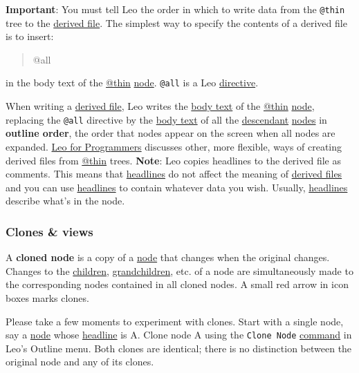 \documentclass[10pt,a4paper,english]{article}
\begin{document}
\textbf{Important}:
You must tell Leo the order in which to write data from the \texttt{@thin} tree to the \href{\#derived-files}{derived file}.
The simplest way to specify the contents of a derived file is to insert:
\begin{quote}{\ttfamily \raggedright \noindent
@all
}\end{quote}

in the body text of the \href{glossary.html\#thin}{@thin} \href{glossary.html\#node}{node}.
\texttt{@all} is a Leo \href{\#leo-directives}{directive}.

When writing a \href{\#derived-files}{derived file}, Leo writes the \href{glossary.html\#body-text}{body text} of the \href{glossary.html\#thin}{@thin} \href{glossary.html\#node}{node},
replacing the \texttt{@all} directive by the \href{glossary.html\#body-text}{body text} of all the \href{glossary.html\#descendant}{descendant} \href{glossary.html\#nodes}{nodes} in \textbf{outline order},
the order that nodes appear on the screen when all nodes are expanded.
\href{\#leo-for-programmers}{Leo for Programmers} discusses other, more flexible, ways of creating derived files from \href{glossary.html\#thin}{@thin} trees.
\textbf{Note}: Leo copies headlines to the derived file as comments.
This means that \href{glossary.html\#headlines}{headlines} do not affect the meaning of \href{\#derived-files}{derived files} and
you can use \href{glossary.html\#headlines}{headlines} to contain whatever data you wish.
Usually, \href{glossary.html\#headlines}{headlines} describe what's in the node.



\hypertarget{clones-views}{}
\subsubsection*{Clones {\&} views}

A \textbf{cloned node} is a copy of a \href{glossary.html\#node}{node} that changes when the original changes.
Changes to the \href{glossary.html\#child}{children}, \href{glossary.html\#grandchildren}{grandchildren}, etc. of a node are simultaneously made
to the corresponding nodes contained in all cloned nodes. A small red arrow in
icon boxes marks clones.

Please take a few moments to experiment with clones. Start with a single node,
say a \href{glossary.html\#node}{node} whose \href{glossary.html\#headline}{headline} is A. Clone node A using the \texttt{Clone Node} \href{commands.html}{command}
in Leo's Outline menu. Both clones are identical; there is no distinction
between the original node and any of its clones.
\end{document}

